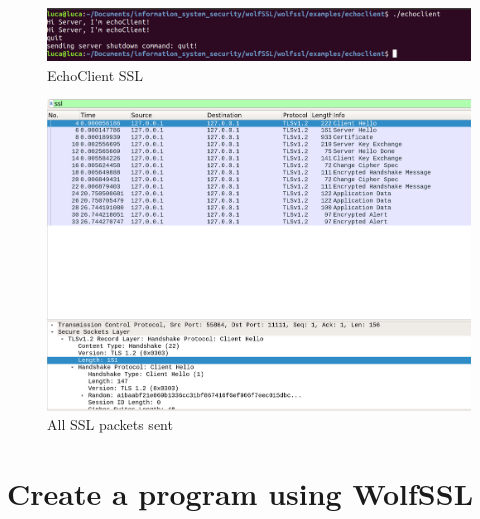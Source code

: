 \documentclass[a4paper,12pt]{report}
\begin{document}
\begin{figure}[H]
\hspace*{-1cm}     
    \centering
    \includegraphics[scale=0.25]{test/examples/echoclient-echoserver/echoClient.png}
    \caption{EchoClient SSL}
    \label{fig:galaxy}
\end{figure}

\begin{figure}[H]
\hspace*{-2cm}     
    \centering
    \includegraphics[scale=0.3]{test/examples/echoclient-echoserver/wireshark.png}
    \caption{All SSL packets sent}
    \label{fig:galaxy}
\end{figure}

\chapter{Create a program using WolfSSL}
\end{document}
